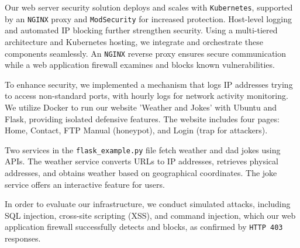 Our web server security solution deploys and scales with \verb+Kubernetes+, supported by an \verb+NGINX+ proxy and \verb+ModSecurity+ for increased protection. Host-level logging and automated IP blocking further strengthen security. Using a multi-tiered architecture and Kubernetes hosting, we integrate and orchestrate these components seamlessly. An \verb+NGINX+ reverse proxy ensures secure communication while a web application firewall examines and blocks known vulnerabilities.

To enhance security, we implemented a mechanism that logs IP addresses trying to access non-standard ports, with hourly logs for network activity monitoring. We utilize Docker to run our website 'Weather and Jokes' with Ubuntu and Flask, providing isolated defensive features. The website includes four pages: Home, Contact, FTP Manual (honeypot), and Login (trap for attackers).

Two services in the \verb+flask_example.py+ file fetch weather and dad jokes using APIs. The weather service converts URLs to IP addresses, retrieves physical addresses, and obtains weather based on geographical coordinates. The joke service offers an interactive feature for users.

In order to evaluate our infrastructure, we conduct simulated attacks, including SQL injection, cross-site scripting (XSS), and command injection, which our web application firewall successfully detects and blocks, as confirmed by \verb+HTTP 403+ responses.

